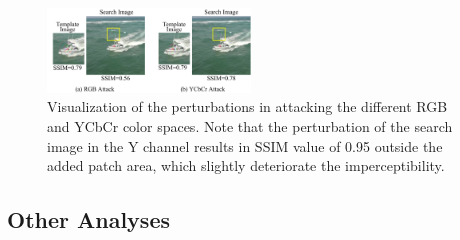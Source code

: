 \documentclass[journal]{IEEEtran}
\begin{document}
\begin{figure}[t]
  \centering
  \includegraphics[width=0.48\textwidth]{images_imperceptible/1.pdf}
  \caption{Visualization of the perturbations in attacking the different RGB and YCbCr color spaces. Note that the perturbation of the search image in the Y channel results in SSIM value of 0.95 outside the added patch area, which slightly deteriorate the imperceptibility.
  }
  \label{fig:YCbCr}
  \vspace{-3mm}
\end{figure}

\subsection{Other Analyses}
\end{document}
